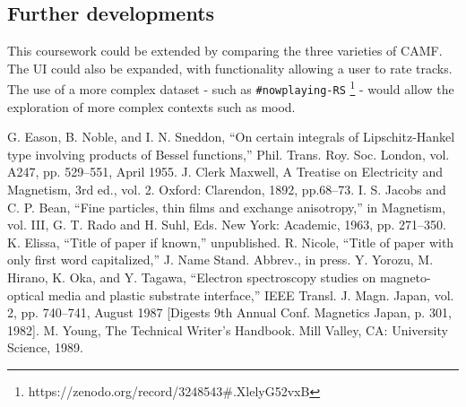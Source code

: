 \documentclass[conference]{IEEEtran}
\begin{document}
\subsection{Further developments}

This coursework could be extended by comparing the three varieties of CAMF. The UI could also be expanded, with functionality allowing a user to rate tracks. The use of a more complex dataset - such as \verb|#nowplaying-RS| \footnote{https://zenodo.org/record/3248543\#.XlelyG52vxB} - would allow the exploration of more complex contexts such as mood.

\begin{thebibliography}{00}
 G. Eason, B. Noble, and I. N. Sneddon, ``On certain integrals of Lipschitz-Hankel type involving products of Bessel functions,'' Phil. Trans. Roy. Soc. London, vol. A247, pp. 529--551, April 1955.
 J. Clerk Maxwell, A Treatise on Electricity and Magnetism, 3rd ed., vol. 2. Oxford: Clarendon, 1892, pp.68--73.
 I. S. Jacobs and C. P. Bean, ``Fine particles, thin films and exchange anisotropy,'' in Magnetism, vol. III, G. T. Rado and H. Suhl, Eds. New York: Academic, 1963, pp. 271--350.
 K. Elissa, ``Title of paper if known,'' unpublished.
 R. Nicole, ``Title of paper with only first word capitalized,'' J. Name Stand. Abbrev., in press.
 Y. Yorozu, M. Hirano, K. Oka, and Y. Tagawa, ``Electron spectroscopy studies on magneto-optical media and plastic substrate interface,'' IEEE Transl. J. Magn. Japan, vol. 2, pp. 740--741, August 1987 [Digests 9th Annual Conf. Magnetics Japan, p. 301, 1982].
 M. Young, The Technical Writer's Handbook. Mill Valley, CA: University Science, 1989.
\end{thebibliography}
\end{document}
